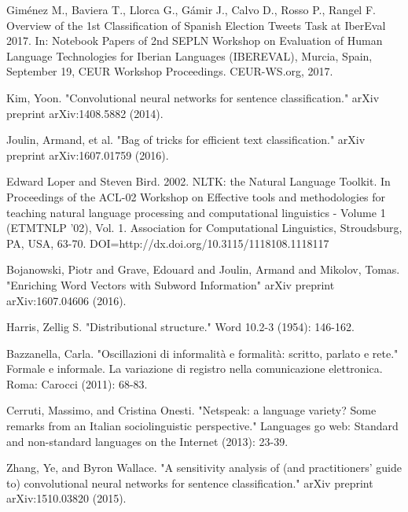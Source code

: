 \begin{thebibliography}{1}

Giménez M., Baviera T., Llorca G., Gámir J., Calvo D., Rosso P., Rangel F.
Overview of the 1st Classification of Spanish Election Tweets Task at IberEval 2017. In: Notebook Papers of 2nd SEPLN Workshop on Evaluation of Human Language Technologies for Iberian Languages (IBEREVAL), Murcia, Spain, September 19, CEUR Workshop Proceedings. CEUR-WS.org, 2017.

Kim, Yoon. "Convolutional neural networks for sentence classification." arXiv preprint arXiv:1408.5882 (2014).

Joulin, Armand, et al. "Bag of tricks for efficient text classification." arXiv preprint arXiv:1607.01759 (2016).

Edward Loper and Steven Bird. 2002. NLTK: the Natural Language Toolkit. In Proceedings of the ACL-02 Workshop on Effective tools and methodologies for teaching natural language processing and computational linguistics - Volume 1 (ETMTNLP '02), Vol. 1. Association for Computational Linguistics, Stroudsburg, PA, USA, 63-70. DOI=http://dx.doi.org/10.3115/1118108.1118117


Bojanowski, Piotr and Grave, Edouard and Joulin, Armand and Mikolov, Tomas. "Enriching Word Vectors with Subword Information" arXiv preprint arXiv:1607.04606 (2016).

Harris, Zellig S. "Distributional structure." Word 10.2-3 (1954): 146-162.

Bazzanella, Carla. "Oscillazioni di informalità e formalità: scritto, parlato e rete." Formale e informale. La variazione di registro nella comunicazione elettronica. Roma: Carocci (2011): 68-83.

Cerruti, Massimo, and Cristina Onesti. "Netspeak: a language variety? Some remarks from an Italian sociolinguistic perspective." Languages go web: Standard and non-standard languages on the Internet (2013): 23-39.

Zhang, Ye, and Byron Wallace. "A sensitivity analysis of (and practitioners' guide to) convolutional neural networks for sentence classification." arXiv preprint arXiv:1510.03820 (2015).

\end{thebibliography}